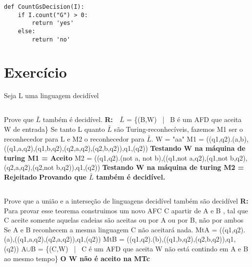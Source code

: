 \documentclass[12pt]{scrartcl}
\begin{document}
\begin{verbatim}
def CountGsDecision(I):
    if I.count("G") > 0:
        return 'yes'
    else:
        return 'no'
\end{verbatim}

\section{Exercício}
Seja L uma linguagem decidível
\subsection{}
Prove que $\bar{L}$ também é decidível.
\newline\newline\textbf{R:}\ \ $\bar{L}$ = \{(B,W) \ | \ B é um AFD que aceita W de entrada\}
\newline Se tanto L quanto $\bar{L}$ são Turing-reconhecíveis, fazemos M1 ser o reconhecedor para L e M2 o reconhecedor para $\bar{L}$.
\newline W = "aa"
\newline M1 = ((q1,q2).(a,b),((q1,a,q2),(q1,b,q2),(q2,a,q2),(q2,b,q2)),q1,(q2))
\newline \textbf{Testando W na máquina de turing M1 = Aceito}
\newline M2 = ((q1,q2).(not a, not b),((q1,not a,q2),(q1,not b,q2),(q2,a,q2),(q2,not b,q2)),q1,(q2))
\newline \textbf{Testando W na máquina de turing M2 = Rejeitado}
\newline\textbf{ Provando que $\bar{L}$ também é decidível. }




\subsection{}
Prove que a união e a interseção de linguagens decidível também são decidível
\newline\newline\textbf{R:} Para provar esse teorema construimos um novo AFC C apartir de A e B , tal que C aceite somente aquelas cadeias são aceitas ou por A ou por B, não por ambos Se A e B reconhecem a mesma linguagem C não aceitará nada.
\newline MtA = ((q1,q2).(a),((q1,a,q2),(q2,a,q2)),q1,(q2))
\newline MtB = ((q1,q2).(b),((q1,b,q2),(q2,b,q2)),q1,(q2))
\newline A$\cup$B = \{(C,W) \ | \ C é um AFD que aceita W não está contindo em A e B ao mesmo tempo\}
\newline \textbf{O W não é aceito na MTc}
\end{document}
